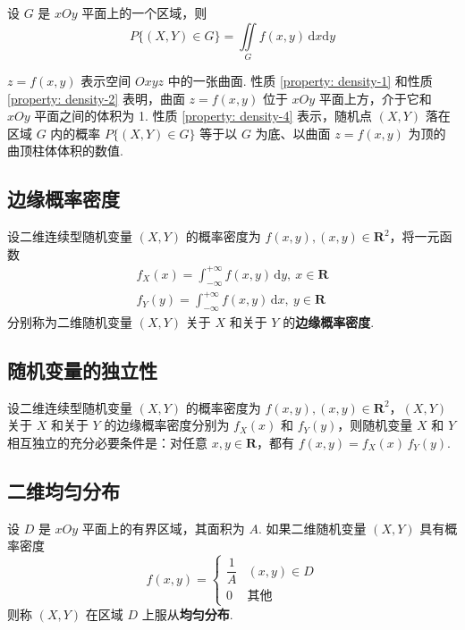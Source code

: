 \begin{property} \label{property: density-4}
    设 $G$ 是 $xOy$ 平面上的一个区域，则
    $$
    P\{(X,Y) \in G\} = \underset{G}{\iint} f(x,y) \, \text{d}x \text{d}y
    $$
\end{property}

$z=f(x,y)$ 表示空间 $Oxyz$ 中的一张曲面. 性质 \ref*{property: density-1} 和性质 \ref*{property: density-2} 表明，曲面 $z=f(x,y)$ 位于 $xOy$ 平面上方，介于它和 $xOy$ 平面之间的体积为 1. 性质 \ref*{property: density-4} 表示，随机点 $(X,Y)$ 落在区域 $G$ 内的概率 $P\{(X,Y) \in G\}$ 等于以 $G$ 为底、以曲面 $z=f(x,y)$ 为顶的曲顶柱体体积的数值.

\subsection{边缘概率密度}

\begin{definition}
    设二维连续型随机变量 $(X,Y)$ 的概率密度为 $f(x,y), (x,y) \in \mathbf{R}^2$，将一元函数
    \begin{gather*}
        f_{X}(x) = \int_{-\infty}^{+\infty} f(x,y) \, \text{d}y, \ x \in \mathbf{R} \\
        f_{Y}(y) = \int_{-\infty}^{+\infty} f(x,y) \, \text{d}x, \ y \in \mathbf{R}
    \end{gather*}
    分别称为二维随机变量 $(X,Y)$ 关于 $X$ 和关于 $Y$ 的\textbf{边缘概率密度}.
\end{definition}

\subsection{随机变量的独立性}

设二维连续型随机变量 $(X,Y)$ 的概率密度为 $f(x,y), (x,y) \in \mathbf{R}^2$，$(X,Y)$ 关于 $X$ 和关于 $Y$ 的边缘概率密度分别为 $f_{X}(x)$ 和 $f_{Y}(y)$，则随机变量 $X$ 和 $Y$ 相互独立的充分必要条件是：对任意 $x,y \in \mathbf{R}$，都有 $f(x,y)=f_{X}(x) \, f_{Y}(y)$.

\subsection{二维均匀分布}

设 $D$ 是 $xOy$ 平面上的有界区域，其面积为 $A$. 如果二维随机变量 $(X,Y)$ 具有概率密度
$$
f(x,y)=\begin{cases}
    \dfrac{1}{A} & (x,y) \in D \\[0.5em]
    0 & \text{其他}
\end{cases}
$$
则称 $(X,Y)$ 在区域 $D$ 上服从\textbf{均匀分布}.

